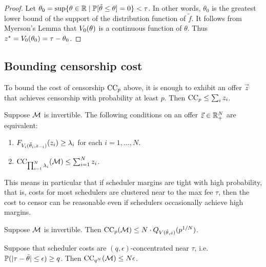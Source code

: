\begin{proof}
  Let $\theta_0=\sup\{\theta\in\mathbb{R} \mid \mathbb{P}[\tilde{\theta}\leq\theta ]= 0\}<\tau$.
  In other words, $\theta_0$ is the greatest lower bound of the support of the distribution function of $\tilde{f}$.
  It follows from Myerson's Lemma that $V_0(\theta)$ is a continuous function of $\theta$.
  Thus $z^*=V_0(\theta_0) = \tau-\theta_0$.
  \qedhere
 

\end{proof}


\subsection{Bounding censorship cost}

To bound the cost of censorship $\mathrm{CC}_{p}$ above, it is enough to exhibit an offer $\vec{z}$ that achieves censorship with probability at least $p$.
%
Then $\mathrm{CC}_{p}\leq \sum_iz_i$.


\begin{proposition}

  Suppose $\mathcal{M}$ is invertible.
  The following conditions on an offer $\vec{z}\in\mathbb{R}_+^N$ are equivalent:
  \begin{enumerate}
    \item 
      $F_{V_i(\tilde\theta_i,z_{-i})}(z_i) \geq \lambda_i$ for each $i=1,\ldots, N$.

    \item
      $\mathrm{CC}_{\prod_{i=1}^N\lambda_i}(\mathcal{M}) \leq \sum_{i=1}^N z_i$.
  \end{enumerate}

\end{proposition}

This means in particular that if scheduler margins are tight with high probability, that is, costs for most schedulers are clustered near to the max fee $\tau$, then the cost to censor can be reasonable even if schedulers occasionally achieve high margins.

\begin{corollary}

  Suppose $\mathcal{M}$ is invertible.
  Then $\mathrm{CC}_{p}(\mathcal{M}) \leq N\cdot Q_{V(\tilde\theta,z)}(p^{1/N})$.

\end{corollary}

\begin{corollary}

  Suppose that scheduler costs are $(q,\epsilon)$-concentrated near $\tau$, i.e.~$\mathbb{P}(|\tau-\tilde\theta| \leq \epsilon) \geq q$.
  Then $\mathrm{CC}_{q^N}(\mathcal{M})\leq N\epsilon$.

\end{corollary}

